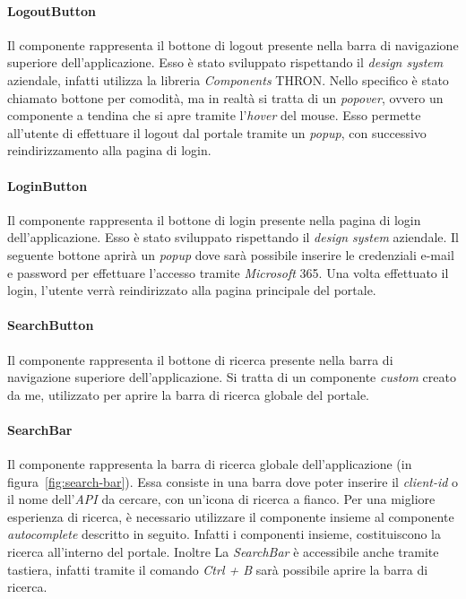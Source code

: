 \paragraph{LogoutButton}\label{par:logout-button}
Il componente rappresenta il bottone di logout presente nella barra di navigazione superiore dell'applicazione.
Esso è stato sviluppato rispettando il \textit{design system} aziendale, infatti utilizza la libreria \textit{Components} THRON.
Nello specifico è stato chiamato bottone per comodità, ma in realtà si tratta di un \textit{popover}, ovvero un componente a tendina che si apre
tramite l'\textit{hover} del mouse. Esso permette all'utente di effettuare il logout dal portale tramite un \textit{popup}, con successivo reindirizzamento
alla pagina di login.


\paragraph{LoginButton}\label{par:login-button}
Il componente rappresenta il bottone di login presente nella pagina di login dell'applicazione. Esso è stato sviluppato rispettando il \textit{design system} aziendale.
Il seguente bottone aprirà un \textit{popup} dove sarà possibile inserire le credenziali e-mail e password per effettuare l'accesso tramite \textit{Microsoft} 365.
Una volta effettuato il login, l'utente verrà reindirizzato alla pagina principale del portale.

\paragraph{SearchButton}\label{par:search-button}
Il componente rappresenta il bottone di ricerca presente nella barra di navigazione superiore dell'applicazione.
Si tratta di un componente \textit{custom} creato da me, utilizzato per aprire la barra di ricerca globale del portale. 

\paragraph{SearchBar}\label{par:search-bar}
Il componente rappresenta la barra di ricerca globale dell'applicazione (in figura~\ref{fig:search-bar}). 
Essa consiste in una barra dove poter inserire il \textit{client-id} o il nome dell'\textit{API} da cercare,
con un'icona di ricerca a fianco. Per una migliore esperienza di ricerca, è necessario utilizzare il componente insieme al componente \textit{autocomplete} descritto in seguito.
Infatti i componenti insieme, costituiscono la ricerca all'interno del portale. Inoltre La \textit{SearchBar} è accessibile anche tramite tastiera,
infatti tramite il comando \textit{Ctrl + B} sarà possibile aprire la barra di ricerca.\\

